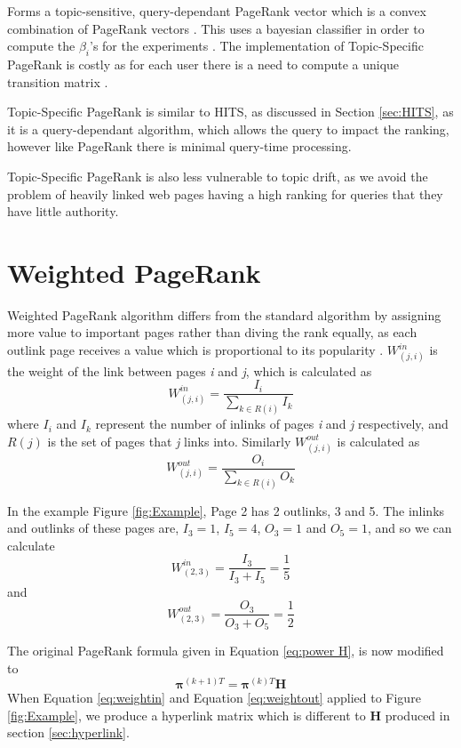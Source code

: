 \documentclass[11pt]{report}
\begin{document}
{Forms a topic-sensitive, query-dependant PageRank vector which is a convex combination of PageRank vectors \cite{langville}. This uses a bayesian classifier in order to compute the $\beta_i$'s for the experiments \cite{langville}.   The implementation of Topic-Specific PageRank is costly as for each user there is a need to compute a unique transition matrix \cite{manning}. 

Topic-Specific PageRank is similar to HITS, as discussed in Section \ref{sec:HITS}, as it is a query-dependant algorithm, which allows the query to impact the ranking, however like PageRank there is minimal query-time processing. 

Topic-Specific PageRank is also less vulnerable to topic drift, as we avoid the problem of heavily linked web pages having a high ranking for queries that they have little authority. 

\section{Weighted PageRank}\label{sec:weighted}

Weighted PageRank algorithm differs from the standard algorithm by assigning more value to important pages rather than diving the rank equally, as each outlink page receives a value which is proportional to its popularity \cite{xing2004weighted}. $W^{in}_{(j,i)}$ is the weight of the link between pages \textit{i} and \textit{j}, which is calculated as 
\begin{equation}\label{eq:weightin}
W^{in}_{(j,i)} = \frac{I_i}{\sum_{k\in R(i)}I_k}
\end{equation}
where $I_i$ and $I_k$ represent the number of inlinks of pages \textit{i} and \textit{j} respectively, and $R(j)$ is the set of pages that \textit{j} links into. 
Similarly $W^{out}_{(j,i)}$ is calculated as
\begin{equation}\label{eq:weightout}
W^{out}_{(j,i)} = \frac{O_i}{\sum_{k\in R(i)}O_k}
\end{equation}

In the example Figure \ref{fig:Example}, Page 2 has 2 outlinks, 3 and 5. The inlinks and outlinks of these pages are, $I_3 = 1$, $I_5 = 4$, $O_3 = 1$ and $O_5 = 1$, and so we can calculate 
\[W^{in}_{(2,3)} = \frac{I_3}{I_3 + I_5} = \frac{1}{5} \]
and 
\[W^{out}_{(2,3)} = \frac{O_3}{O_3 + O_5} = \frac{1}{2} \] 

The original PageRank formula given in Equation \eqref{eq:power H}, is now modified to 
\begin{equation} \label{eq:Weighted PageRank formula}
\boldsymbol\pi^{(k+1)T} = \boldsymbol\pi^{(k)T}\textbf{H}
\end{equation}
When Equation \eqref{eq:weightin} and Equation \eqref{eq:weightout} applied to Figure \ref{fig:Example}, we produce a hyperlink matrix which is different to \textbf{H} produced in section \ref{sec:hyperlink}. 

}
\end{document}
